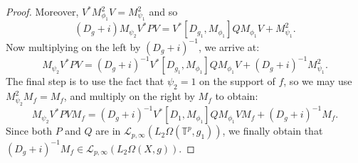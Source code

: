 \begin{proof}
        Moreover, $V^*M_{\phi_1}^2V = M_{\psi_1}^2$ and so
        \begin{equation*}
            (D_g+i)M_{\psi_2}V^*PV = V^*[D_{g_1},M_{\phi_1}]QM_{\phi_1}V+M_{\psi_1}^2.
        \end{equation*}
        Now multiplying on the left by $(D_g+i)^{-1}$, we arrive at:
        \begin{equation*}
            M_{\psi_2}V^*PV = (D_g+i)^{-1}V^*[D_{g_1},M_{\phi_1}]QM_{\phi_1}V+(D_g+i)^{-1}M_{\psi_1}^2.
        \end{equation*}
        The final step is to use the fact that $\psi_2=1$ on the support of $f$, so we may use $M_{\psi_2}^2M_f = M_f$, and multiply on the right by $M_f$
        to obtain:
        \begin{equation*}
            M_{\psi_2}V^*PVM_f = (D_g+i)^{-1}V^*[D_1,M_{\phi_1}]QM_{\phi_1}VM_f+(D_g+i)^{-1}M_f.
        \end{equation*}
        Since both $P$ and $Q$ are in $\mathcal{L}_{p,\infty}(L_2\Omega(\mathbb{T}^p,g_1))$, we finally obtain that $(D_g+i)^{-1}M_f \in \mathcal{L}_{p,\infty}(L_2\Omega(X,g))$.
    \end{proof}
    
